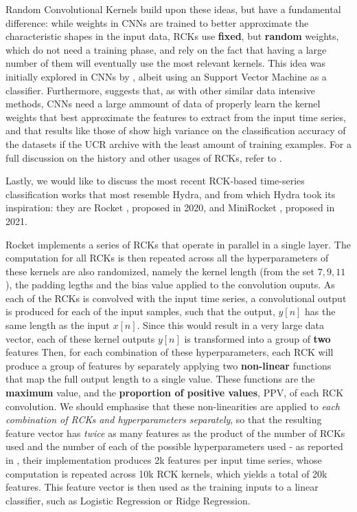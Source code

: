 Random Convolutional Kernels build upon these ideas, but have a fundamental difference: while weights in CNNs are trained to better approximate the characteristic shapes in the input data, RCKs use \textbf{fixed}, but \textbf{random} weights, which do not need a training phase, and rely on the fact that having a large number of them will eventually
use the most relevant kernels. This idea was initially explored in CNNs by \cite{Saxe2011random}, albeit using an Support Vector Machine as a classifier. 
Furthermore, \cite{Dempster2020} suggests that, as with other similar data intensive methods, CNNs need a large ammount of data of properly learn the kernel weights that best approximate the features to extract from the input time series, and that results like those of \cite{Fawaz2020} show high variance on the classification accuracy of the datasets
if the UCR archive with the least amount of training examples. For a full discussion on the history and other usages of RCKs, refer to \cite{Dempster2020}.

Lastly, we would like to discuss the most recent RCK-based time-series classification works that most resemble Hydra, and from which Hydra took its inspiration: they are Rocket \cite{Dempster2020}, proposed in 2020, and MiniRocket \cite{Dempster2021MR}, proposed in 2021.

Rocket \cite{Dempster2020} implements a series of RCKs that operate in parallel in a single layer. The computation for all RCKs is then repeated across all the hyperparameters of these kernels are also randomized, namely the kernel length (from the set ${7, 9, 11}$), the padding legths and the bias value applied to the convolution ouputs. 
As each of the RCKs is convolved with the input time series, a convolutional output is produced for each of the input samples, such that the output, $y[n]$ has the same length as the input $x[n]$. Since this would result in a very large data vector, each of these kernel outputs $y[n]$ is transformed into a group of \textbf{two} features
Then, for each combination of these hyperparameters, each RCK will produce a group of features by separately applying two \textbf{non-linear} functions that map the full output length to a single value. These functions are the \textbf{maximum} value, and the \textbf{proportion of positive values}, PPV,  of each RCK convolution. We should emphasise that these
non-linearities are applied to \emph{each combination of RCKs and hyperparameters separately}, so that the resulting feature vector has \emph{twice} as many features as the product of the number of RCKs used and the number of each of the possible hyperparameters used - as reported in \cite{Dempster2020}, their implementation produces 2k features
per input time series, whose computation is repeated across 10k RCK kernels, which yields a total of 20k features. This feature vector is then used as the training inputs to a linear classifier, such as Logistic Regression or Ridge Regression.

